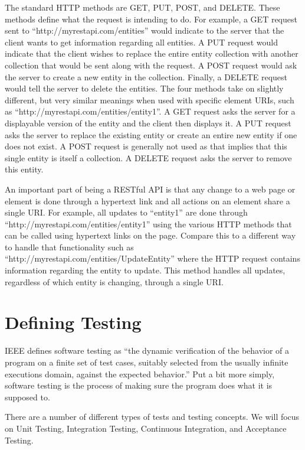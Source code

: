 \documentclass[12pt]{ucthesis}
\begin{document}
The standard HTTP methods are GET, PUT, POST, and DELETE. These methods define what the request is intending to do. For example, a GET request sent to ``http://myrestapi.com/entities'' would indicate to the server that the client wants to get information regarding all entities. A PUT request would indicate that the client wishes to replace the entire entity collection with another collection that would be sent along with the request. A POST request would ask the server to create a new entity in the collection. Finally, a DELETE request would tell the server to delete the entities. The four methods take on slightly different, but very similar meanings when used with specific element URIs, such as ``http://myrestapi.com/entities/entity1''. A GET request asks the server for a displayable version of the entity and the client then displays it. A PUT request asks the server to replace the existing entity or create an entire new entity if one does not exist. A POST request is generally not used as that implies that this single entity is itself a collection. A DELETE request asks the server to remove this entity.

An important part of being a RESTful API is that any change to a web page or element is done through a hypertext link and all actions on an element share a single URI. For example, all updates to ``entity1'' are done through ``http://myrestapi.com/entities/entity1'' using the various HTTP methods that can be called using hypertext links on the page. Compare this to a different way to handle that functionality such as ``http://myrestapi.com/entities/UpdateEntity'' where the HTTP request contains information regarding the entity to update. This method handles all updates, regardless of which entity is changing, through a single URI.

\section{Defining Testing}
IEEE defines software testing as ``the dynamic verification of the behavior of a program on a finite set of test cases, suitably selected from the usually infinite executions domain, against the expected behavior.''\cite{TestingDefinition} Put a bit more simply, software testing is the process of making sure the program does what it is supposed to.

There are a number of different types of tests and testing concepts. We will focus on Unit Testing, Integration Testing, Continuous Integration, and Acceptance Testing.
\end{document}
